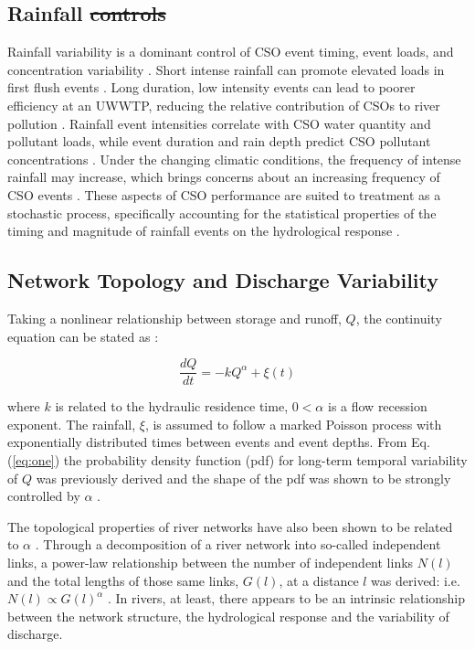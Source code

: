 \documentclass[draft,linenumbers]{agujournal2018}
\providecommand{\DIFadd}[1]{{\protect\color{blue}\uwave{#1}}} %
\providecommand{\DIFdel}[1]{{\protect\color{red}\sout{#1}}}                      %
\providecommand{\DIFaddbegin}{} %
\providecommand{\DIFaddend}{} %
\providecommand{\DIFdelbegin}{} %
\providecommand{\DIFdelend}{} %
\begin{document}
\subsection{Rainfall \DIFdelbegin \DIFdel{controls}\DIFdelend \DIFaddbegin \DIFadd{Controls}\DIFaddend }
Rainfall variability is a dominant control of CSO event timing, event loads, and concentration variability \DIFdelbegin %
\DIFdelend \DIFaddbegin \citep{COUTU2012477,Geiger_1998,Sandoval_2013}\DIFaddend . Short intense rainfall can promote elevated loads in f\/irst f\/lush events \citep{Krebs_1999}. Long duration, low intensity events can lead to poorer ef\/f\/iciency at an UWWTP, reducing the relative contribution of CSOs to river pollution \citep{Phillips_2012}. Rainfall event intensities correlate with CSO water quantity and pollutant loads, while event duration and rain depth predict CSO pollutant concentrations \citep{Sandoval_2013}. Under the changing climatic conditions, the frequency of intense rainfall may increase, which brings concerns about an increasing frequency of CSO events \citep{Semadeni_Davies_2008,Sterk_2016}. These aspects of CSO performance are suited to treatment as a stochastic process, specif\/ically accounting for the statistical properties of the timing and magnitude of rainfall events on the hydrological response \citep{Botter_2009}.

\subsection{Network Topology and Discharge Variability}
Taking a nonlinear relationship between storage and runof\/f, $Q$, the continuity equation can be stated as \citep{Botter_2009}:
\begin{linenomath*}
\begin{equation}
\frac{dQ}{dt} = -k Q^\alpha+\xi(t)
\label{eq:one}
\end{equation}
\end{linenomath*}
where $k$ is related to the hydraulic residence time, $0< \alpha$ is a f\/low recession exponent. The rainfall, $\xi$, is assumed to follow a marked Poisson process with exponentially distributed times between events and event depths. From Eq. (\ref{eq:one}) the probability density function (pdf) for long-term temporal variability of $Q$ was previously derived and the shape of the pdf was shown to be strongly controlled by $\alpha$ \citep{Botter_2009}.

The topological properties of river networks have also been shown to be related to $\alpha$ \citep{Biswal_2014}. Through a decomposition of a river network into so-called independent links, a power-law relationship between the number of independent links $N(l)$ and the total lengths of those same links, $G(l)$, at a distance $l$ was derived: i.e. $N(l) \propto G(l)^\alpha$  \citep{Biswal_2010}. In rivers, at least, there appears to be an intrinsic relationship between the network structure, the hydrological response and the variability of discharge. 
\end{document}
